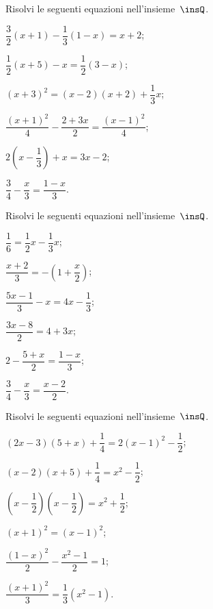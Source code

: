 \begin{esercizio}[\Ast] %
\label{ese:15.31}
Risolvi le seguenti equazioni nell'insieme~$\insQ$.
\begin{multicols}{2}
\begin{enumeratea}
 \item $\dfrac{3}{2}(x+1)-\dfrac{1}{3}(1-x)=x+2$;
 \item $\dfrac{1}{2}(x+5)-x=\dfrac{1}{2}(3-x)$;
 \item $(x+3)^{2}=(x-2)(x+2)+\dfrac{1}{3}x$;
 \item $\dfrac{(x+1)^{2}}{4}-\dfrac{2+3x}{2}=\dfrac{(x-1)^{2}}{4}$;
 \item $2\left(x-\dfrac{1}{3}\right)+x=3x-2$;
 \item $\dfrac{3}{4}-\dfrac{x}{3}=\dfrac{1-x}{3}$.
\end{enumeratea}
\end{multicols}
\end{esercizio}

\begin{esercizio}[\Ast]
\label{ese:15.32}
Risolvi le seguenti equazioni nell'insieme~$\insQ$.
\begin{multicols}{2}
\begin{enumeratea}
 \item $\dfrac{1}{6}=\dfrac{1}{2}x-\dfrac{1}{3}x$;
 \item $\dfrac{x+2}{3}=-\left(1+\dfrac{x}{2}\right)$;
 \item $\dfrac{5x-1}{3}-x=4x-\dfrac{1}{3}$;
 \item $\dfrac{3x-8}{2}=4+3x$;
 \item $2-\dfrac{5+x}{2}=\dfrac{1-x}{3}$;
 \item $\dfrac{3}{4}-\dfrac{x}{3}=\dfrac{x-2}{2}$.
\end{enumeratea}
\end{multicols}
\end{esercizio}

\begin{esercizio}[\Ast]
\label{ese:15.33}
Risolvi le seguenti equazioni nell'insieme~$\insQ$.
\begin{multicols}{2}
\begin{enumeratea}
 \item $(2x-3)(5+x)+\dfrac{1}{4}=2(x-1)^{2}-\dfrac{1}{2}$;
 \item $(x-2)(x+5)+\dfrac{1}{4}=x^{2}-\dfrac{1}{2}$;
 \item $\left(x-\dfrac{1}{2}\right)\left(x-\dfrac{1}{2}\right)=x^{2}+\dfrac{1}{2}$;
 \item $(x+1)^{2}=(x-1)^{2}$;
 \item $\dfrac{(1-x)^{2}}{2}-\dfrac{x^{2}-1}{2}=1$;
 \item $\dfrac{(x+1)^{2}}{3}=\dfrac{1}{3}(x^{2}-1)$.
\end{enumeratea}
\end{multicols}
\end{esercizio}

